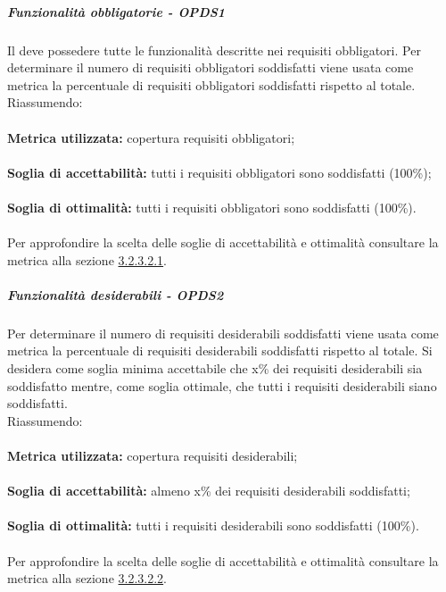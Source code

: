 \documentclass[PianoDiQualifica.tex]{subfiles}
\begin{document}
				\subparagraph{Funzionalità obbligatorie - OPDS1}
				Il  deve possedere tutte le funzionalità descritte nei requisiti obbligatori. Per determinare il numero di requisiti obbligatori soddisfatti viene usata 
				come metrica la percentuale di requisiti obbligatori soddisfatti rispetto al totale. \\
				Riassumendo: \\ \\
				\textbf{Metrica utilizzata:} copertura requisiti obbligatori;\\ \\
				\textbf{Soglia di accettabilità:} tutti i requisiti obbligatori sono soddisfatti (100\%); \\ \\
				\textbf{Soglia di ottimalità:} tutti i requisiti obbligatori sono soddisfatti (100\%). \\ \\
				Per approfondire la scelta delle soglie di accettabilità e ottimalità consultare la metrica alla sezione \hyperlink{req_obbligatori}{3.2.3.2.1}.
				
				\subparagraph{Funzionalità desiderabili - OPDS2}
				Per determinare il numero di requisiti desiderabili soddisfatti viene usata come metrica la percentuale di requisiti desiderabili soddisfatti rispetto al totale.
				Si desidera come soglia minima accettabile che x\% dei requisiti desiderabili sia soddisfatto mentre, come soglia ottimale, che tutti i requisiti desiderabili siano soddisfatti. \\
				Riassumendo: \\ \\
				\textbf{Metrica utilizzata:} copertura requisiti desiderabili;\\ \\
				\textbf{Soglia di accettabilità:} almeno x\% dei requisiti desiderabili soddisfatti; \\ \\
				\textbf{Soglia di ottimalità:} tutti i requisiti desiderabili sono soddisfatti (100\%). \\ \\
				Per approfondire la scelta delle soglie di accettabilità e ottimalità consultare la metrica alla sezione \hyperlink{req_desiderabili}{3.2.3.2.2}.
				
\end{document}
